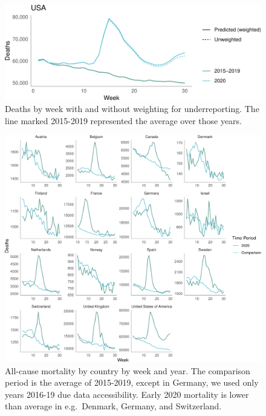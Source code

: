 \documentclass[
]{article}
\begin{document}
\begin{figure}
\centering
\includegraphics{extended_supplement_FINAL_files/figure-latex/notes-1.pdf}
\caption{\label{supp.fig.weighting} Deaths by week with and without
weighting for underreporting. The line marked 2015-2019 represented the
average over those years.}
\end{figure}

\clearpage

\begin{figure}
\centering
\includegraphics{extended_supplement_FINAL_files/figure-latex/unnamed-chunk-1-1.pdf}
\caption{\label{supp.weekly.deaths} All-cause mortality by country by
week and year. The comparison period is the average of 2015-2019, except
in Germany, we used only years 2016-19 due data accessibility. Early
2020 mortality is lower than average in e.g.~Denmark, Germany, and
Switzerland.}
\end{figure}

\clearpage
\end{document}
